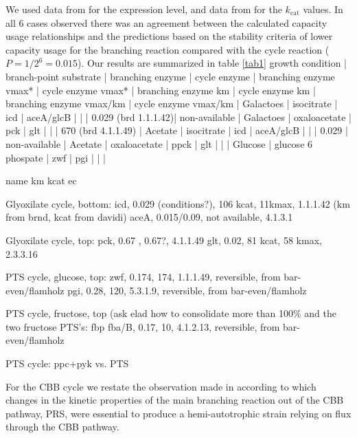 \documentclass[a4page,notitlepage]{article}
\begin{document}
    We used data from \cite{Schmidt2015} for the expression level, and data from \cite{BRENDA/Davidi} for the $k_\text{cat}$ values.
    In all 6 cases observed there was an agreement between the calculated capacity usage relationships and the predictions based on the stability criteria of lower capacity usage for the branching reaction compared with the cycle reaction ($P=1/2^6=0.015$).
    Our results are summarized in table \ref{tab1}
    growth condition    | branch-point substrate    | branching enzyme | cycle enzyme   | branching enzyme vmax* | cycle enzyme vmax* | branching enzyme km | cycle enzyme km   | branching enzyme vmax/km | cycle enzyme vmax/km |
    Galactoes           | isocitrate                | icd              | aceA/glcB      |                        |                    | 0.029 (brd 1.1.1.42)| non-available     |
    Galactoes           | oxaloacetate              | pck              | glt            |                        |                    | 670 (brd 4.1.1.49)  |
    Acetate             | isocitrate                | icd              | aceA/glcB      |                        |                    | 0.029               | non-available     |
    Acetate             | oxaloacetate              | ppck             | glt            |                        |                    |
    Glucose             | glucose 6 phospate        | zwf              | pgi            |                        |                    |
    

    name km kcat ec

    Glyoxilate cycle, bottom:
    icd, 0.029 (conditions?), 106 kcat, 11kmax, 1.1.1.42 (km from brnd, kcat from davidi)
    aceA, 0.015/0.09, not available, 4.1.3.1

    Glyoxilate cycle, top:
    pck, 0.67 , 0.67?, 4.1.1.49
    glt, 0.02, 81 kcat, 58 kmax, 2.3.3.16

    PTS cycle, glucose, top:
    zwf, 0.174, 174, 1.1.1.49, reversible, from bar-even/flamholz
    pgi, 0.28, 120, 5.3.1.9, reversible, from bar-even/flamholz

    PTS cycle, fructose, top (ask elad how to consolidate more than 100\% and the two fructose PTS's:
    fbp
    fba/B, 0.17, 10, 4.1.2.13, reversible, from bar-even/flamholz

    PTS cycle: ppc+pyk vs. PTS

    For the CBB cycle we restate the observation made in \cite{Antonovski2016} according to which changes in the kinetic properties of the main branching reaction out of the CBB pathway, PRS, were essential to produce a hemi-autotrophic strain relying on flux through the CBB pathway.
\end{document}
